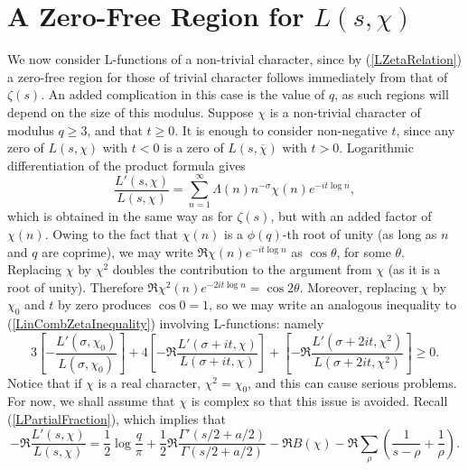 \section{A Zero-Free Region for $L(s, \chi)$}
We now consider L-functions of a non-trivial character, since by (\ref{LZetaRelation}) a zero-free region for those of trivial character follows immediately from that of $\zeta(s)$. An added complication in this case is the value of $q$, as such regions will depend on the size of this modulus. Suppose $\chi$ is a non-trivial character of modulus $q \geq 3$, and that $t \geq 0$. It is enough to consider non-negative $t$, since any zero of $L(s, \chi)$ with $t < 0$ is a zero of $L(s, \overline{\chi})$ with $t > 0$. Logarithmic differentiation of the product formula gives 
\begin{equation}
    \frac{L'(s, \chi)}{L(s, \chi)} = \sum_{n=1}^{\infty}\Lambda(n) n^{-\sigma}\chi(n)e^{-i t \log n}, \nonumber
\end{equation}
which is obtained in the same way as for $\zeta(s)$, but with an added factor of $\chi(n)$. Owing to the fact that $\chi(n)$ is a $\phi(q)$-th root of unity (as long as $n$ and $q$ are coprime), we may write $\mathfrak{R}\chi(n)e^{-i t \log n}$ as $\cos\theta$, for some $\theta$. Replacing $\chi$ by $\chi^{2}$ doubles the contribution to the argument from $\chi$ (as it is a root of unity). Therefore $\mathfrak{R}\chi^{2}(n)e^{-2 i t \log n} = \cos 2\theta$. Moreover, replacing $\chi$ by $\chi_0$ and $t$ by zero produces $\cos 0 = 1$, so we may write an analogous inequality to (\ref{LinCombZetaInequality}) involving L-functions: namely
\begin{equation}
\label{LinCombLRelation}
    3\left[-\frac{L'(\sigma, \chi_0)}{L(\sigma, \chi_0)} \right] + 4\left[-\mathfrak{R} \frac{L'(\sigma + i t, \chi)}{L(\sigma + i t, \chi)} \right] + \left[-\mathfrak{R} \frac{L'(\sigma + 2i t, \chi^{2})}{L(\sigma + 2i t, \chi^{2})} \right] \geq 0.
\end{equation}
Notice that if $\chi$ is a real character, $\chi^{2} = \chi_0$, and this can cause serious problems. For now, we shall assume that $\chi$ is complex so that this issue is avoided. Recall (\ref{LPartialFraction}), which implies that 
\begin{equation}
\label{RealLogDiffL}
    -\mathfrak{R}\frac{L'(s, \chi)}{L(s, \chi)} = \frac12 \log\frac{q}{\pi} + \frac12 \mathfrak{R}\frac{\Gamma'(s/2 + a/2)}{\Gamma(s/2 + a/2)} - \mathfrak{R}B(\chi) - \mathfrak{R}\sum_{\rho} \left( \frac{1}{s - \rho} + \frac{1}{\rho} \right). \nonumber
\end{equation}
